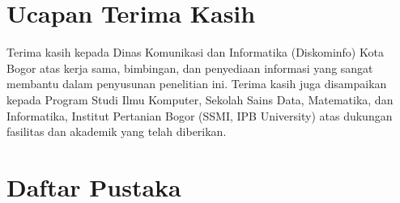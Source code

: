 \documentclass[10pt,twocolumn]{article}
\begin{document}
\section*{Ucapan Terima Kasih}

Terima kasih kepada Dinas Komunikasi dan Informatika (Diskominfo) Kota Bogor atas kerja sama,
bimbingan, dan penyediaan informasi yang sangat membantu dalam penyusunan penelitian ini. Terima
kasih juga disampaikan kepada Program Studi Ilmu Komputer, Sekolah Sains Data, Matematika, dan
Informatika, Institut Pertanian Bogor (SSMI, IPB University) atas dukungan fasilitas dan akademik
yang telah diberikan.

\section*{Daftar Pustaka}
\end{document}
